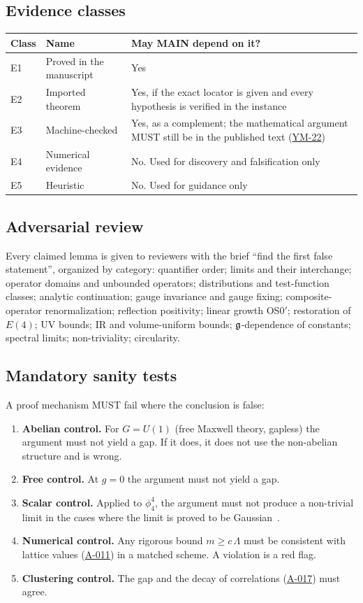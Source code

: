 \documentclass[11pt,a4paper]{article}
\newcommand{\idref}[1]{\hyperref[#1]{\textsf{#1}}}
\begin{document}
\subsection{Evidence classes}
\begin{center}\small
\begin{tabularx}{\textwidth}{@{}p{1.0cm}P{3.6cm}X@{}}
\toprule
Class & Name & May MAIN depend on it?\\
\midrule
E1 & Proved in the manuscript & Yes\\
E2 & Imported theorem & Yes, if the exact locator is given and every hypothesis is verified in the instance\\
E3 & Machine-checked & Yes, as a complement; the mathematical argument MUST still be in the published text (\idref{YM-22})\\
E4 & Numerical evidence & No. Used for discovery and falsification only\\
E5 & Heuristic & No. Used for guidance only\\
\bottomrule
\end{tabularx}
\end{center}

\subsection{Adversarial review}
Every claimed lemma is given to reviewers with the brief \enquote{find the first false statement}, organized by category: quantifier order; limits and their interchange; operator domains and unbounded operators; distributions and test-function classes; analytic continuation; gauge invariance and gauge fixing; composite-operator renormalization; reflection positivity; linear growth OS0$'$; restoration of $E(4)$; UV bounds; IR and volume-uniform bounds; $\mathfrak g$-dependence of constants; spectral limits; non-triviality; circularity.

\subsection{Mandatory sanity tests}
A proof mechanism MUST fail where the conclusion is false:
\begin{enumerate}[label=(\alph*)]
\item \textbf{Abelian control.} For $G=U(1)$ (free Maxwell theory, gapless) the argument must not yield a gap. If it does, it does not use the non-abelian structure and is wrong.
\item \textbf{Free control.} At $g=0$ the argument must not yield a gap.
\item \textbf{Scalar control.} Applied to $\phi^4_4$, the argument must not produce a non-trivial limit in the cases where the limit is proved to be Gaussian~\cite{ADC21}.
\item \textbf{Numerical control.} Any rigorous bound $m\ge c\,\Lambda$ must be consistent with lattice values (\idref{A-011}) in a matched scheme. A violation is a red flag.
\item \textbf{Clustering control.} The gap and the decay of correlations (\idref{A-017}) must agree.
\end{enumerate}
\end{document}
